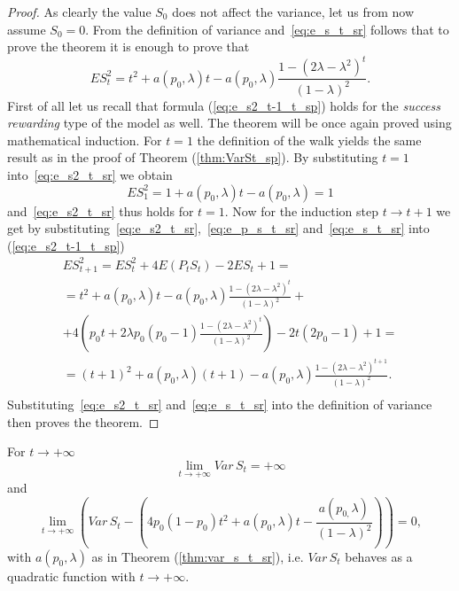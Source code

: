 \documentclass[runningheads]{CMSIM}
\begin{document}
    \begin{proof}
        As clearly the value $S_{0}$ does not affect the variance, let us
        from now assume $S_{0}=0$.
        From the definition of variance and~\eqref{eq:e_s_t_sr}
        follows that to prove the theorem it is enough to prove that
        \begin{equation}
            ES_{t}^{2}=t^{2}+a(p_{0},\lambda)t-a(p_{0},\lambda)\frac{1-(2\lambda-\lambda^{2})^{t}}{(1-\lambda)^{2}}.\label{eq:e_s2_t_sr}
        \end{equation}
        First of all let us recall that formula (\ref{eq:e_s2_t-1_t_sp})
        holds for the \emph{success rewarding} type of the model as well.
        The theorem will be once again proved using mathematical induction.
        For $t=1$ the definition of the walk yields the same result as in
        the proof of Theorem (\ref{thm:VarSt_sp}).
        By substituting $t=1$
        into~\eqref{eq:e_s2_t_sr} we obtain
        \[
            ES_{1}^{2}=1+a(p_{0},\lambda)t-a(p_{0},\lambda)=1
        \]
        and~\eqref{eq:e_s2_t_sr} thus holds for $t=1$.
        Now for the induction
        step $t\rightarrow t+1$ we get by substituting~\eqref{eq:e_s2_t_sr},~\eqref{eq:e_p_s_t_sr} and~\eqref{eq:e_s_t_sr} into (\ref{eq:e_s2_t-1_t_sp})
        \begin{gather*}
            ES_{t+1}^{2}=ES_{t}^{2}+4E(P_{t}S_{t})-2ES_{t}+1=\\
            =t^{2}+a(p_{0},\lambda)t-a(p_{0},\lambda)\frac{1-(2\lambda-\lambda^{2})^{t}}{(1-\lambda)^{2}}+\\
            +4(p_{0}t+2\lambda p_{0}(p_{0}-1)\frac{1-(2\lambda-\lambda^{2})^{t}}{(1-\lambda)^{2}})-2t(2p_{0}-1)+1=\\
            =(t+1)^{2}+a(p_{0},\lambda)(t+1)-a(p_{0},\lambda)\frac{1-(2\lambda-\lambda^{2})^{t+1}}{(1-\lambda)^{2}}.\\
        \end{gather*}
        Substituting~\eqref{eq:e_s2_t_sr} and~\eqref{eq:e_s_t_sr} into the
        definition of variance then proves the theorem.
    \end{proof}
    \begin{corollary}
        \label{cor:var_s_t_sr}For $t\rightarrow+\infty$
        \[
            \lim_{t\rightarrow+\infty}Var\,S_{t}=+\infty
        \]
        and
        \[
            \lim_{t\rightarrow+\infty}\left(Var\,S_{t}-\left(4p_{0}(1-p_{0})t^{2}+a(p_{0},\lambda)t-\frac{a(p_{0,}\lambda)}{(1-\lambda)^{2}}\right)\right)=0,
        \]
        with $a(p_{0},\lambda)$ as in Theorem (\ref{thm:var_s_t_sr}), i.e.
        $Var\,S_{t}$ behaves as a quadratic function with $t\rightarrow+\infty$.
    \end{corollary}
\end{document}
